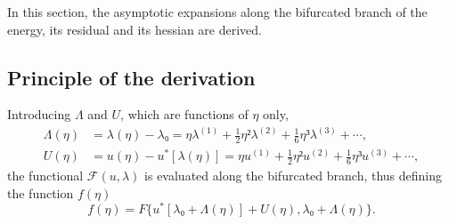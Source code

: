 \documentclass[12pt, final]{scrartcl}
\theoremstyle{definition}
\newcommand{\order}[2][1]{#2^{(#1)}}
\begin{document}
In this section, the asymptotic expansions along the bifurcated branch of the
energy, its residual and its hessian are derived.

\subsection{Principle of the derivation}
\label{sec:20220107121442}
%

Introducing \(Λ\) and \(U\), which are functions of \(η\) only,
\begin{align}
  \label{eq:20211112155446}
  Λ(η) & = λ(η) - λ₀ = η \order[1]λ + \tfrac{1}{2} η² \order[2]λ + \tfrac{1}{6} η³ \order[3]λ + \cdots,\\
  \label{eq:20211112113028}
  U(η) & = u(η) - u^{\ast}[λ(η)] = η \order[1]u + \tfrac{1}{2} η² \order[2]u + \tfrac{1}{6} η³ \order[3]u + \cdots,
\end{align}
the functional \(\mathcal{F}(u, λ)\) is evaluated along the bifurcated branch,
thus defining the function \(f(η)\)
\begin{equation*}
  f(η) = F\{ u^{\ast} [λ₀ + Λ(η)] + U(η), λ₀ + Λ(η) \}.
\end{equation*}
\end{document}
